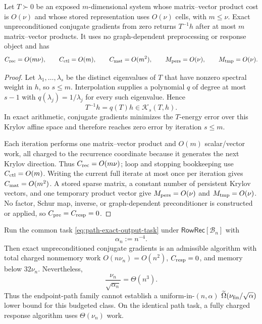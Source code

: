 \begin{lemma}
\label{lem:finite-krylov-cap}
Let $T\succ0$ be an exposed $m$-dimensional system whose matrix--vector product
cost is $O(\nu)$ and whose stored representation uses $O(\nu)$ cells, with
$m\leq\nu$.  Exact unpreconditioned conjugate gradients from zero returns
$T^{-1}h$ after at most $m$ matrix--vector products.  It uses no
graph-dependent preprocessing or response object and has
\begin{equation}
 C_{\rm rec}=O(m\nu),\qquad
 C_{\rm ctl}=O(m),\qquad
 C_{\rm mat}=O(m^2),\qquad
 M_{\rm pers}=O(\nu),\qquad M_{\rm tmp}=O(\nu).
 \label{eq:finite-krylov-resource-cap}
\end{equation}
\end{lemma}

\begin{proof}
Let $\lambda_1,\ldots,\lambda_s$ be the distinct eigenvalues of $T$ that have
nonzero spectral weight in $h$, so $s\leq m$.  Interpolation supplies a
polynomial $q$ of degree at most $s-1$ with
$q(\lambda_j)=1/\lambda_j$ for every such eigenvalue.  Hence
\[
 T^{-1}h=q(T)h\in\mathcal K_s(T,h).
\]
In exact arithmetic, conjugate gradients minimizes the $T$-energy error over
this Krylov affine space and therefore reaches zero error by iteration
$s\leq m$.

Each iteration performs one matrix--vector product and $O(m)$ scalar/vector
work, all charged to the recurrence coordinate because it generates the next
Krylov direction.  Thus $C_{\rm rec}=O(m\nu)$; loop and stopping bookkeeping
use $C_{\rm ctl}=O(m)$.
Writing the current full iterate at most once per iteration gives
$C_{\rm mat}=O(m^2)$.  A stored sparse matrix, a constant number of persistent
Krylov vectors, and one temporary product vector give
$M_{\rm pers}=O(\nu)$ and $M_{\rm tmp}=O(\nu)$.  No
factor, Schur map, inverse, or graph-dependent preconditioner is constructed
or applied, so $C_{\rm pre}=C_{\rm resp}=0$.
\end{proof}

\begin{theorem}
\label{thm:path-krylov-counteralgorithm}
Run the common task \cref{eq:path-exact-output-task} under
$\mathsf{RowRec}[\mathcal B_n]$ with
\begin{equation}
 \alpha_n:=n^{-4}.
 \label{eq:krylov-counter-alpha}
\end{equation}
Then exact unpreconditioned conjugate gradients is an admissible algorithm
with total charged nonmemory work
$O(n\nu_n)=O(n^2)$, $C_{\rm resp}=0$, and memory below $32\nu_n$.
Nevertheless,
\begin{equation}
 \frac{\nu_n}{\sqrt{\alpha_n}}=\Theta(n^3).
 \label{eq:krylov-product-contradiction}
\end{equation}
Thus the endpoint-path family cannot establish a uniform-in-$(n,\alpha)$
$\widetilde\Omega(\nu_{\rm fin}/\sqrt\alpha)$ lower bound for this budgeted
class.  On the identical path task, a fully charged response algorithm uses
$\Theta(\nu_n)$ work.
\end{theorem}

